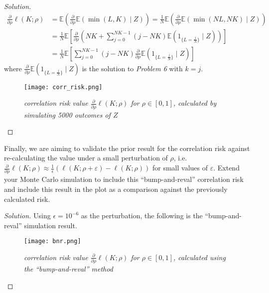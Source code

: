 \documentclass[10pt]{article}
\newcommand{\E}{\mathbb{E}}
\newenvironment{problem}[2][Problem]{\begin{trivlist}
\item[\hskip \labelsep {\bfseries #1}\hskip \labelsep {\bfseries #2.}]}{\end{trivlist}}
\begin{document}
\begin{proof}[Solution]
    \begin{align*}
        \frac{\partial}{\partial \rho} \ell(K;\rho) &= \E \left( \frac{\partial}{\partial \rho} \E(\min(L, K) \mid Z) \right) = \frac{1}{N} \E \left( \frac{\partial}{\partial \rho} \E(\min(NL, NK) \mid Z) \right) \\
        &= \frac{1}{N} \E \left[ \frac{\partial}{\partial \rho} \left( NK + \sum_{j=0}^{NK-1} (j-NK) \E \left( 1_{\{L = \frac{j}{N}\}} \mid Z \right) \right) \right] \\
        &= \frac{1}{N} \E \left[ \sum_{j=0}^{NK-1} (j-NK) \frac{\partial}{\partial \rho} \E \left( 1_{\{L = \frac{j}{N}\}} \mid Z \right) \right]
    \end{align*}
    where $\frac{\partial}{\partial \rho} \E \left( 1_{\{L = \frac{j}{N}\}} \mid Z \right)$ is the solution to \textit{Problem 6} with $k = j$.

    \begin{figure}[H]
        \begin{center}
            \texttt{[image: corr\_risk.png]}
            \caption{\textit{correlation risk value $\frac{\partial}{\partial \rho} \ell(K;\rho)$ for $\rho \in [0, 1]$, calculated by simulating 5000 outcomes of $Z$}}
            \label{fig:corr_risk}
        \end{center}
    \end{figure}
\end{proof}



\begin{problem}{10}
    Finally, we are aiming to validate the prior result for the correlation risk against re-calculating the value under a small perturbation of $\rho$, i.e. $\frac{\partial}{\partial \rho} \ell(K; \rho) \approx \frac{1}{\epsilon} (\ell(K; \rho + \varepsilon) - \ell(K; \rho))$ for small values of $\varepsilon$.
    Extend your Monte Carlo simulation to include this ``bump-and-reval'' correlation risk and include this result in the plot as a comparison against the previously calculated risk.
\end{problem}

\begin{proof}[Solution]
    Using $\epsilon = 10^{-6}$ as the perturbation, the following is the ``bump-and-reval'' simulation result.
    
    \begin{figure}[H]
        \begin{center}
            \texttt{[image: bnr.png]}
            \caption{\textit{correlation risk value $\frac{\partial}{\partial \rho} \ell(K;\rho)$ for $\rho \in [0, 1]$, calculated using the ``bump-and-reval'' method}}
            \label{fig:bnr}
        \end{center}
    \end{figure}
\end{proof}
\end{document}
